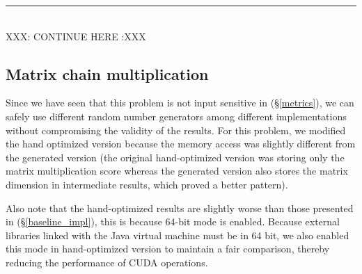 \newpage
{\center\color{red} \noindent\rule{16cm}{0.4pt} \\ XXX: CONTINUE HERE :XXX \\}
\subsection{Matrix chain multiplication}
Since we have seen that this problem is not input sensitive in (\S\ref{metrics}), we can safely use different random number generators among different implementations without compromising the validity of the results. For this problem, we modified the hand optimized version because the memory access was slightly different from the generated version (the original hand-optimized version was storing only the matrix multiplication score whereas the generated version also stores the matrix dimension in intermediate results, which proved a better pattern).

Also note that the hand-optimized results are slightly worse than those presented in (\S\ref{baseline_impl}), this is because 64-bit mode is enabled. Because external libraries linked with the Java virtual machine must be in 64 bit, we also enabled this mode in hand-optimized version to maintain a fair comparison, thereby reducing the performance of CUDA operations.

